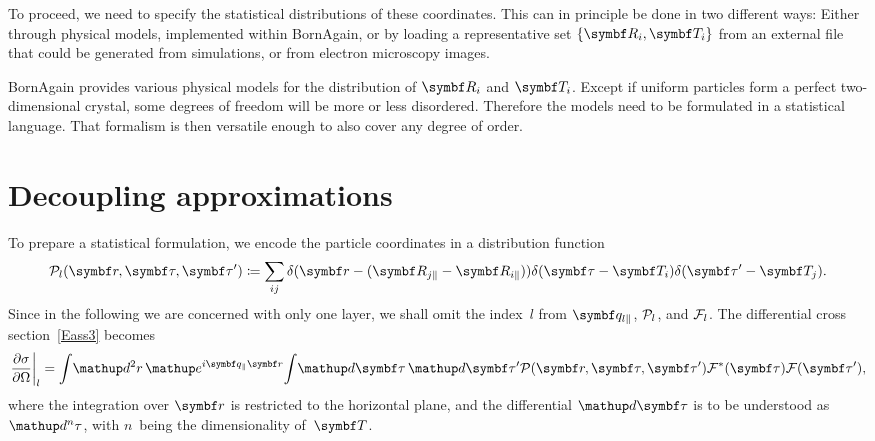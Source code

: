 

To proceed,
we need to specify the statistical distributions
of these coordinates.
This can in principle be done in two different ways:
Either through physical models, implemented within BornAgain,
or by loading a representative set $\{\R_i,\v{T}_i\}$
from an external  file
that could be generated from simulations,
or from electron microscopy images.

\addtocounter{footnote}{1}

BornAgain provides various physical models
for the distribution of $\R_i$ and $\v{T}_i$.
Except if uniform particles form a perfect two-dimensional crystal,
some degrees of freedom will be more or less disordered.
Therefore the models need to be formulated in a statistical language.
That formalism is then versatile enough to also cover any degree of order.

\section{Decoupling approximations}\label{Spartidis}

To prepare a statistical formulation,
we encode the particle coordinates in a distribution function
%
%
%
\begin{equation}\label{EPDdeltas}
  \PD_{l}(\r,\v\tau,\v\tau')
  \coloneqq \sum_{ij} \delta(\r-(\R_{j\plll}-\R_{i\plll}))
  \delta(\v\tau-\v{T}_i)\delta(\v\tau'-\v{T}_j).
\end{equation}
Since in the following we are concerned with only one layer,
we shall omit the index~$l$ from $\q_{l\plll}$, $\mathcal{P}_l$, and $\mathcal{F}_l$.
The differential cross section~\cref{Eass3} becomes
\begin{equation}\label{Epdm1}
  \left.\frac{\partial\sigma}{\partial\Omega}\right|_l
  =
  \int\!\d^2r\,   \e^{i\q_{\plll}\r}\!
  \int\! \d\v{\tau}\, \d\v{\tau}'
    \PD(\r,\v\tau,\v\tau')
    \FD^*(\v\tau) \FD(\v\tau'),
\end{equation}
where the integration over $\r$ is restricted to the horizontal plane,
and the differential $\d\v{\tau}$ is to be understood as $\d^n\tau$,
with $n$~being the dimensionality of~$\v{T}$.

